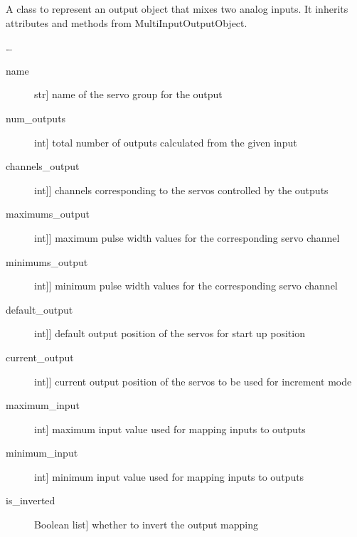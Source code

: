 \documentclass[letterpaper,10pt,english]{sphinxmanual}
\begin{document}
\begin{fulllineitems}
\label{\detokenize{generic:AnalogMixerOutput.AnalogMixerOutput}}
\sphinxAtStartPar
A class to represent an output object that mixes two analog inputs.
It inherits attributes and methods from MultiInputOutputObject.

\sphinxAtStartPar
…
\begin{description}
\item[{name}] \leavevmode{[}str{]}
\sphinxAtStartPar
name of the servo group for the output

\item[{num\_outputs}] \leavevmode{[}int{]}
\sphinxAtStartPar
total number of outputs calculated from the given input

\item[{channels\_output}] \leavevmode{[}{[}int{]}{]}
\sphinxAtStartPar
channels corresponding to the servos controlled by the outputs

\item[{maximums\_output}] \leavevmode{[}{[}int{]}{]}
\sphinxAtStartPar
maximum pulse width values for the corresponding servo channel

\item[{minimums\_output}] \leavevmode{[}{[}int{]}{]}
\sphinxAtStartPar
minimum pulse width values for the corresponding servo channel

\item[{default\_output}] \leavevmode{[}{[}int{]}{]}
\sphinxAtStartPar
default output position of the servos for start up position

\item[{current\_output}] \leavevmode{[}{[}int{]}{]}
\sphinxAtStartPar
current output position of the servos to be used for increment mode

\item[{maximum\_input}] \leavevmode{[}int{]}
\sphinxAtStartPar
maximum input value used for mapping inputs to outputs

\item[{minimum\_input}] \leavevmode{[}int{]}
\sphinxAtStartPar
minimum input value used for mapping inputs to outputs

\item[{is\_inverted}] \leavevmode{[}Boolean list{]}
\sphinxAtStartPar
whether to invert the output mapping


\end{description}
\end{fulllineitems}
\end{document}

